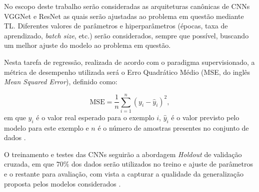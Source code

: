 No escopo deste trabalho serão consideradas as arquiteturas canônicas de CNNs VGGNet  e ResNet as quais serão ajustadas ao problema em questão mediante TL. Diferentes valores de parâmetros e hiperparâmetros (épocas, taxa de aprendizado, \emph{batch size}, etc.) serão considerados, sempre que possível, buscando um melhor ajuste do modelo ao problema em questão.

Nesta tarefa de regressão, realizada de acordo com o paradigma supervisionado, a métrica de desempenho utilizada será o Erro Quadrático Médio (MSE, do inglês \emph{Mean Squared Error}), definido como:

\begin{equation}
\textrm{MSE} = \frac{1}{n}\sum_{i=1}^n (y_i - \hat{y}_i)^{2}, \label{eq:mse}
\end{equation} em que $y_i$ é o valor real esperado para o exemplo $i$, $\hat{y}_i$ é o valor previsto pelo modelo para este exemplo e $n$ é o número de amostras presentes no conjunto de dados \cite{ref:faceli}.

O treinamento e testes das CNNs seguirão a abordagem \emph{Holdout} de validação cruzada, em que $70\%$ dos dados serão utilizados no treino e ajuste de parâmetros e o restante para avaliação, com vista a capturar a qualidade da generalização proposta pelos modelos considerados \cite{ref:brink}.
